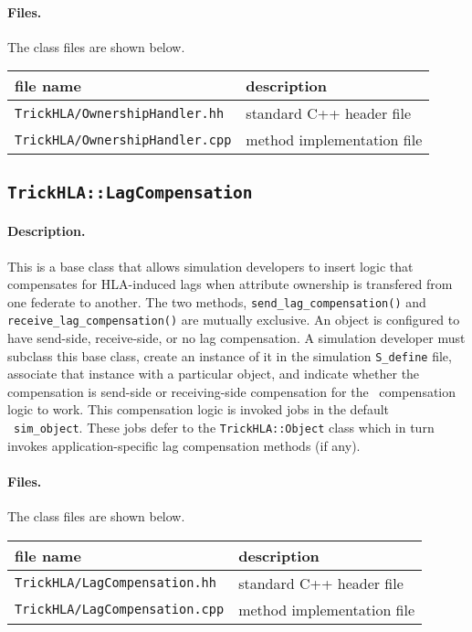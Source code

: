 \paragraph{Files.}
The class files are shown below.
   
{
  \scriptsize
  \begin{tabular}{|l|l|} 
    \hline
    file name & description \\
    \hline \hline
    {\tt TrickHLA/OwnershipHandler.hh} 
    & standard C++ header file
    \\ \hline
    {\tt TrickHLA/OwnershipHandler.cpp} 
    & method implementation file
    \\ \hline
  \end{tabular}
}

\subsection{{\tt TrickHLA::LagCompensation}}

\paragraph{Description.}
This is a base class that allows simulation developers to insert logic
that compensates for HLA-induced lags when attribute ownership is transfered
from one federate to another.
The two methods,
{\tt send\_lag\_compensation()} and {\tt receive\_lag\_compensation()}
are mutually exclusive.
An object is configured to have send-side, receive-side, or no lag compensation.
A simulation developer must subclass this base class, create an instance
of it in the simulation {\tt S\_define} file, associate that instance
with a particular object, and indicate whether the compensation is send-side
or receiving-side compensation for the \TrickHLA\ compensation logic to work.
This compensation logic is invoked jobs in the default \TrickHLA\ 
{\tt sim\_object}. These jobs defer to the {\tt TrickHLA::Object} class 
which in turn invokes application-specific lag compensation methods (if any).

\paragraph{Files.}
The class files are shown below.
   
{
  \scriptsize
  \begin{tabular}{|l|l|} 
    \hline
    file name & description \\
    \hline \hline
    {\tt TrickHLA/LagCompensation.hh} 
    & standard C++ header file
    \\ \hline
    {\tt TrickHLA/LagCompensation.cpp} 
    & method implementation file
    \\ \hline
  \end{tabular}
}

